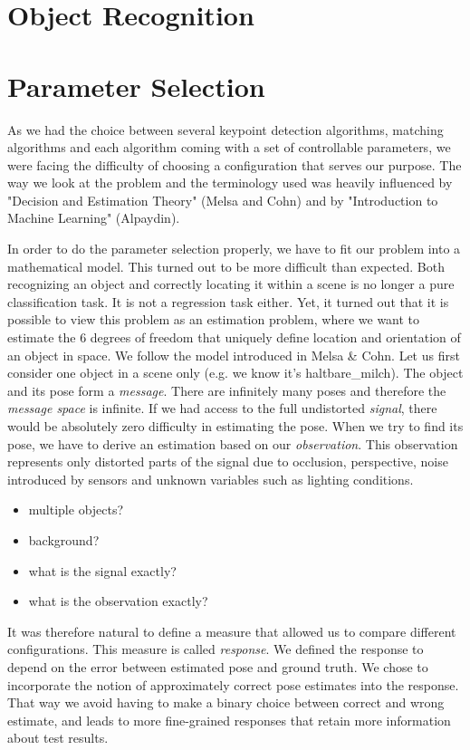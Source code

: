 \section{Object Recognition}

\section{Parameter Selection}

As we had the choice between several keypoint detection algorithms, matching
algorithms and each algorithm coming with a set of controllable parameters, we
were facing the difficulty of choosing a configuration that serves our purpose.
The way we look at the problem and the terminology used was heavily influenced
by "Decision and Estimation Theory" (Melsa and Cohn) and by "Introduction to
Machine Learning" (Alpaydin).

In order to do the parameter selection properly, we have to fit our problem
into a mathematical model. This turned out to be more difficult than expected.
Both recognizing an object and correctly locating it within a scene is no
longer a pure classification task. It is not a regression task either. Yet, it
turned out that it is possible to view this problem as an estimation problem,
where we want to estimate the 6 degrees of freedom that uniquely define
location and orientation of an object in space. We follow the model introduced
in Melsa \& Cohn. Let us first consider one object in a scene only (e.g. we
know it's haltbare\_milch). The object and its pose form a {\it message}. There
are infinitely many poses and therefore the {\it message space} is infinite. If
we had access to the full undistorted {\it signal}, there would be absolutely
zero difficulty in estimating the pose.  When we try to find its pose, we have
to derive an estimation based on our {\it observation}. This observation
represents only distorted parts of the signal due to occlusion, perspective,
noise introduced by sensors and unknown variables such as lighting conditions.
\begin{itemize}
\item multiple objects?
\item background?
\item what is the signal exactly?
\item what is the observation exactly?
\end{itemize}
It was therefore natural to define a measure that allowed us to compare
different configurations. This measure is called {\it response}. We defined the
response to depend on the error between estimated pose and ground truth. We
chose to incorporate the notion of approximately correct pose estimates into
the response. That way we avoid having to make a binary choice between correct
and wrong estimate, and leads to more fine-grained responses that retain more
information about test results.

